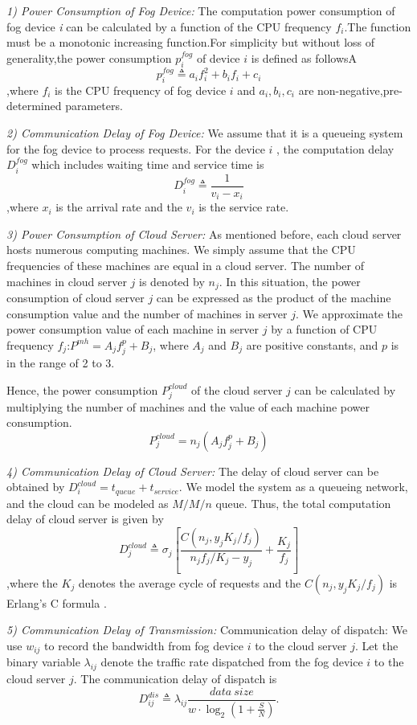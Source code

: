 \documentclass[journal]{IEEEtran}
\begin{document}
\textit{1) Power Consumption of Fog Device:} The computation power consumption of fog device \textit{i} can be calculated by a function of the CPU frequency $f_i$.The function must be a monotonic increasing function.For simplicity but without loss of generality,the power consumption $p_i^{fog} $ of device $i$ is defined as followsA
$$ p_i^{fog} \triangleq a_if_i^2+b_if_i+c_i $$
,where $f_i$ is the CPU frequency of fog device $i$ and $a_i,b_i,c_i$ are non-negative,pre-determined parameters. 

\textit{2) Communication Delay of Fog Device:} We assume that it is a queueing system for the fog device to process requests. For the device $i$ , the computation delay $D_i^{fog}$ which includes waiting time and service time is 
$$ D_i^{fog} \triangleq \frac{1}{v_i-x_i}$$
,where $x_i$ is the arrival rate and the $v_i$ is the service rate.

\textit{3) Power Consumption of Cloud Server:} As mentioned before, each cloud server hosts numerous computing machines. We simply assume that the CPU frequencies of these machines are equal in a cloud server. The number of machines in cloud server $j$ is denoted by $n_j$. In this situation, the power consumption of cloud server $j$ can be expressed as the product of the  machine consumption value and the number of machines in server $j$. We approximate the power consumption value of each machine in server $j$ by a function of CPU frequency $f_j$:$P^{mh} = A_jf_j^p+B_j$, where $A_j$ and $B_j$ are positive constants, and $p$ is in the range of 2 to 3. 

Hence, the power consumption $P_j^{cloud}$ of the cloud server $j$ can be calculated by multiplying the number of machines and the value of each machine power consumption.
$$P_j^{cloud} = n_j\left(A_jf_j^p+B_j\right)$$

\textit{4) Communication Delay of Cloud Server:} The delay of cloud server can be obtained by $D_i^{cloud} = t_{queue}+t_{service}$. We model the system as a queueing network, and the cloud can be modeled as $M/M/n$ queue. Thus, the total computation delay of cloud server is given by
$$D_j^{cloud} \triangleq \sigma_j\left[\frac{C\left(n_j,y_jK_j/f_j\right)}{n_jf_j/K_j-y_j} + \frac{K_j}{f_j}\right]$$ ,where the $K_j$ denotes the average cycle of requests and the $C\left(n_j,y_jK_j/f_j\right)$ is Erlang’s C formula \cite{17}.

\textit{5) Communication Delay of Transmission:}
Communication delay of dispatch: We use $w_{ij}$ to record the bandwidth from fog device $i$ to the cloud server $j$. Let the binary variable $\lambda_{ij}$ denote the traffic rate dispatched from the fog device $i$ to the cloud server $j$. The communication delay of dispatch is 
$$ D_{ij}^{dis} \triangleq \lambda_{ij} \frac{data\ size}{w\cdot \log_2(1+\frac{S}{N})}.$$
\end{document}
